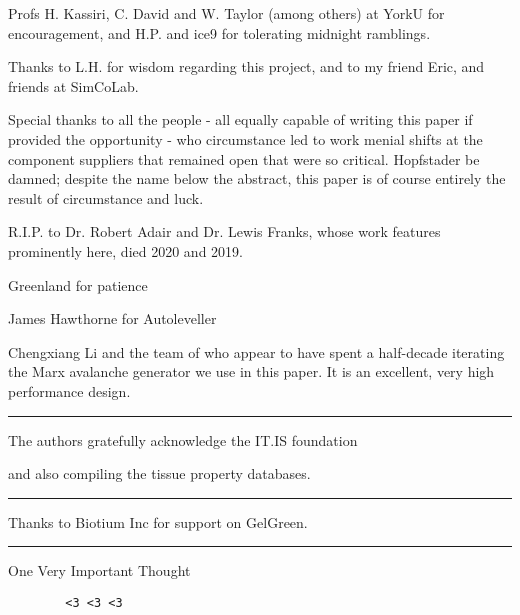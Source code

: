 \documentclass[paper.tex]{subfiles}
\begin{document}
Profs H. Kassiri, C. David and W. Taylor (among others) at YorkU for encouragement, and H.P. and ice9 for tolerating midnight ramblings.

Thanks to L.H. for wisdom regarding this project, and to my friend Eric, and friends at SimCoLab.

Special thanks to all the people - all equally capable of writing this paper if provided the opportunity - who circumstance led to work menial shifts at the component suppliers that remained open that were so critical. Hopfstader be damned; despite the name below the abstract, this paper is of course entirely the result of circumstance and luck. 

R.I.P. to Dr. Robert Adair and Dr. Lewis Franks, whose work features prominently here, died 2020 and 2019.

Greenland for patience

James Hawthorne for Autoleveller


Chengxiang Li and the team of who appear to have spent a half-decade iterating the Marx avalanche generator we use in this paper. It is an excellent, very high performance design.



\rule{\linewidth}{0.2pt}

The authors gratefully acknowledge the IT.IS foundation 

and also compiling the tissue property databases.


\rule{\linewidth}{0.2pt}

Thanks to Biotium Inc for support on GelGreen.

\rule{\linewidth}{0.2pt}

One Very Important Thought


{\Large 
	{
\begin{verbatim}
		<3 <3 <3
\end{verbatim}
}} 
\end{document}
